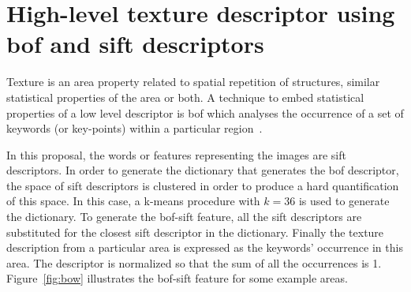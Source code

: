 \documentclass[a4paper, 10pt, conference]{llncs}      %
\begin{document}



\section{High-level texture descriptor using \acf{bof} and \ac{sift} descriptors}%
Texture is an area property related to spatial repetition of structures, similar statistical properties of the area or both. A technique to embed statistical properties of a low level descriptor is \ac{bof} which analyses the occurrence of a set of keywords (or key-points) within a particular region~\cite{csurka2004visual}. 

In this proposal, the words or features representing the images are \ac{sift} descriptors. In order to generate the dictionary that generates the \ac{bof} descriptor, the space of \ac{sift} descriptors is clustered in order to produce a hard quantification of this space. In this case, a k-means procedure with $k=36$ is used to generate the dictionary. To generate the \ac{bof}-\ac{sift} feature, all the \ac{sift} descriptors are substituted for the closest \ac{sift} descriptor in the dictionary. Finally the texture description from a particular area is expressed as the keywords' occurrence in this area. The descriptor is normalized so that the sum of all the occurrences is 1. 
Figure~\ref{fig:bow} illustrates the \ac{bof}-\ac{sift} feature for some example areas. %



\end{document}
